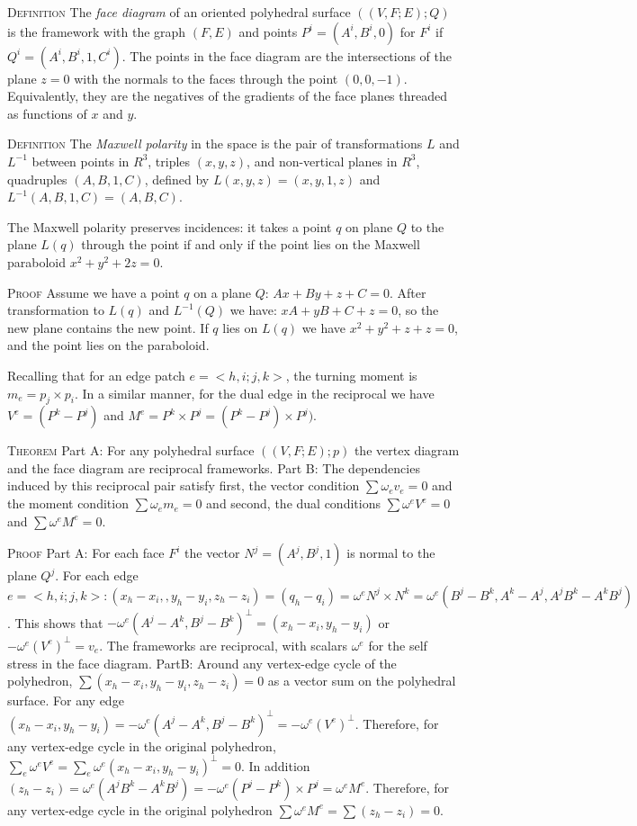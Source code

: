 \documentclass[11pt]{article}
\begin{document}
\textsc{Definition} The \emph{face diagram} of an oriented polyhedral surface $((V,F;E);Q)$ is the framework with the graph $(F,E)$ and points $P^i = (A^i,B^i,0)$ for $F^i$ if $Q^i = (A^i,B^i,1,C^i)$. The points in the face diagram are the intersections of the plane $z=0$ with the normals to the faces through the point $(0,0,-1)$. Equivalently, they are the negatives of the gradients of the face planes threaded as functions of $x$ and $y$.
 
 \textsc{Definition} The \emph{Maxwell polarity} in the space is the pair of transformations $L$ and $L^{-1}$ between points in $R^3$, triples $(x,y,z)$, and non-vertical planes in $R^3$, quadruples $(A,B,1,C)$, defined by $L(x,y,z)=(x,y,1,z)$ and $L^{-1}(A,B,1,C) = (A,B,C)$.
 
 The Maxwell polarity preserves incidences: it takes a point $q$ on plane $Q$ to the plane $L(q)$ through the point if and only if the point lies on the Maxwell paraboloid $x^2 + y^2 + 2z = 0$.
 
 \textsc{Proof} Assume we have a point $q$ on a plane $Q$: $Ax + By + z + C = 0$. After transformation to $L(q)$ and $L^{-1}(Q)$ we have: $xA + yB + C + z = 0$, so the new plane contains the new point. If $q$ lies on $L(q)$ we have $x^2 + y^2 + z + z = 0$, and the point lies on the paraboloid. 
 
 Recalling that for an edge patch $e = <h,i;j,k>$, the turning moment is $m_e = p_j \times p_i$. In a similar manner, for the dual edge in the reciprocal we have $V^e = (P^k - P^j)$ and $M^e = P^k \times P^j = (P^k - P^j)\times P^j)$.
 
 \textsc{Theorem} Part A: For any polyhedral surface $((V,F;E);p)$ the vertex diagram and the face diagram are reciprocal frameworks.
 Part B: The dependencies induced by this reciprocal pair satisfy first, the vector condition $\sum \omega_e v_e = 0$ and the moment condition $\sum \omega_e m_e = 0$ and second, the dual conditions $\sum \omega^e V^e = 0$ and $\sum \omega^e M^e = 0$.
 
 \textsc{Proof} Part A: For each face $F^i$ the vector $N^j = (A^j, B^j,1)$ is normal to the plane $Q^j$. For each edge $e = <h,i;j,k>:  (x_h-x_i,,y_h-y_i, z_h-z_i)=(q_h-q_i) = \omega^e N^j \times N^k = \omega^e(B^j-B^k,A^k-A^j,A^jB^k-A^kB^j)$. This shows that $-\omega^e(A^j-A^k,B^j-B^k)^\bot = (x_h - x_i, y_h-y_i)$ or $-\omega^e(V^e)^\bot = v_e$. The frameworks are reciprocal, with scalars $\omega^e$ for the self stress in the face diagram.
 PartB: Around any vertex-edge cycle of the polyhedron, $\sum(x_h - x_i, y_h-y_i, z_h-z_i) = 0$ as a vector sum on the polyhedral surface. For any edge $(x_h-x_i,y_h-y_i) = -\omega^e(A^j-A^k,B^j-B^k)^\bot = -\omega^e(V^e)^\bot$. Therefore, for any vertex-edge cycle in the original polyhedron, $\sum_e \omega^eV^e = \sum_e \omega^e(x_h-x_i,y_h-y_i)^\bot = 0$. In addition $(z_h-z_i) = \omega^e(A^jB^k-A^kB^j) = -\omega^e(P^j-P^k) \times P^j = \omega^eM^e$. Therefore, for any vertex-edge cycle in the original polyhedron $\sum \omega^eM^e = \sum(z_h-z_i) = 0$. 
 
\end{document}
